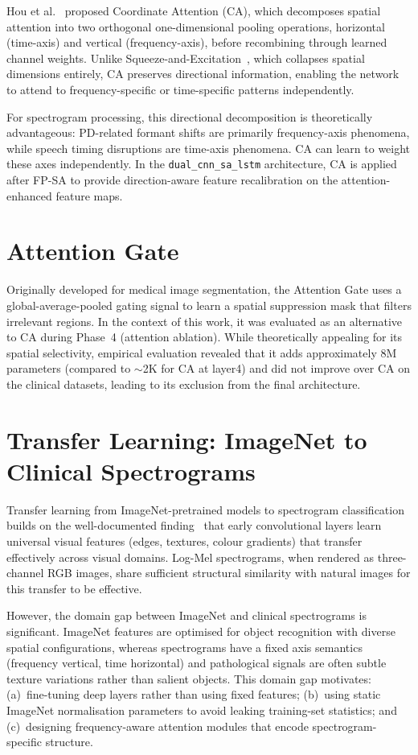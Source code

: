 \documentclass[oneside,openany]{final_report}
\newcommand{\dualcnn}{\texttt{dual\_cnn\_sa\_lstm}}
\begin{document}
Hou et al.~\cite{hou2021} proposed Coordinate Attention (CA), which decomposes spatial attention into two orthogonal one-dimensional pooling operations, horizontal (time-axis) and vertical (frequency-axis), before recombining through learned channel weights. Unlike Squeeze-and-Excitation~\cite{hu2018}, which collapses spatial dimensions entirely, CA preserves directional information, enabling the network to attend to frequency-specific or time-specific patterns independently.

For spectrogram processing, this directional decomposition is theoretically advantageous: PD-related formant shifts are primarily frequency-axis phenomena, while speech timing disruptions are time-axis phenomena. CA can learn to weight these axes independently. In the \dualcnn{} architecture, CA is applied after FP-SA to provide direction-aware feature recalibration on the attention-enhanced feature maps.

\section{Attention Gate}

Originally developed for medical image segmentation, the Attention Gate uses a global-average-pooled gating signal to learn a spatial suppression mask that filters irrelevant regions. In the context of this work, it was evaluated as an alternative to CA during Phase~4 (attention ablation). While theoretically appealing for its spatial selectivity, empirical evaluation revealed that it adds approximately 8M parameters (compared to $\sim$2K for CA at layer4) and did not improve over CA on the clinical datasets, leading to its exclusion from the final architecture.

\section{Transfer Learning: ImageNet to Clinical Spectrograms}

Transfer learning from ImageNet-pretrained models to spectrogram classification builds on the well-documented finding~\cite{he2016} that early convolutional layers learn universal visual features (edges, textures, colour gradients) that transfer effectively across visual domains. Log-Mel spectrograms, when rendered as three-channel RGB images, share sufficient structural similarity with natural images for this transfer to be effective.

However, the domain gap between ImageNet and clinical spectrograms is significant. ImageNet features are optimised for object recognition with diverse spatial configurations, whereas spectrograms have a fixed axis semantics (frequency vertical, time horizontal) and pathological signals are often subtle texture variations rather than salient objects. This domain gap motivates: (a)~fine-tuning deep layers rather than using fixed features; (b)~using static ImageNet normalisation parameters to avoid leaking training-set statistics; and (c)~designing frequency-aware attention modules that encode spectrogram-specific structure.
\end{document}
